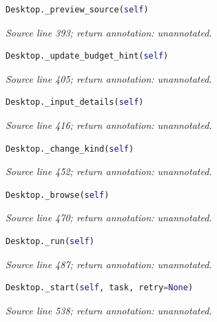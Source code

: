 

\begin{lstlisting}[language=Python]
Desktop._preview_source(self)
\end{lstlisting}


{\small \textit{Source line 393; return annotation: unannotated.}}



\begin{lstlisting}[language=Python]
Desktop._update_budget_hint(self)
\end{lstlisting}


{\small \textit{Source line 405; return annotation: unannotated.}}



\begin{lstlisting}[language=Python]
Desktop._input_details(self)
\end{lstlisting}


{\small \textit{Source line 416; return annotation: unannotated.}}



\begin{lstlisting}[language=Python]
Desktop._change_kind(self)
\end{lstlisting}


{\small \textit{Source line 452; return annotation: unannotated.}}



\begin{lstlisting}[language=Python]
Desktop._browse(self)
\end{lstlisting}


{\small \textit{Source line 470; return annotation: unannotated.}}



\begin{lstlisting}[language=Python]
Desktop._run(self)
\end{lstlisting}


{\small \textit{Source line 487; return annotation: unannotated.}}



\begin{lstlisting}[language=Python]
Desktop._start(self, task, retry=None)
\end{lstlisting}


{\small \textit{Source line 538; return annotation: unannotated.}}

